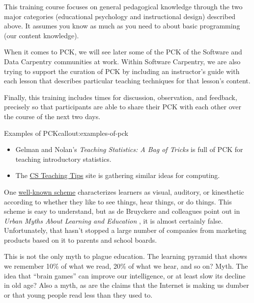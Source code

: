 This training course focuses on general pedagogical knowledge through
the two major categories (educational psychology and instructional
design) described above. It assumes you know as much as you need to
about basic programming (our content knowledge).

When it comes to PCK, we will see later  some
of the PCK of the Software and Data Carpentry communities at
work. Within Software Carpentry, we are also trying to support the
curation of PCK by including an instructor's guide with each lesson
that describes particular teaching techniques for that lesson's
content.

Finally, this training includes times for discussion, observation, and
feedback, precisely so that participants are able to share their PCK
with each other over the course of the next two days.

\begin{callout}{Examples of PCK}{callout:examples-of-pck}

\begin{itemize}
\item
  Gelman and Nolan's
  \emph{Teaching   Statistics: A Bag of Tricks} \cite{bib:gelman-nolan-stats-tricks}
  is full of PCK for teaching introductory statistics.
\item
  The \href{http://csteachingtips.org/}{CS Teaching Tips} site is
  gathering similar ideas for computing.
\end{itemize}
\end{callout}


One
\href{https://en.wikipedia.org/wiki/Learning\_styles\#Learning\_modalities}{well-known
scheme} characterizes learners as visual, auditory, or kinesthetic
according to whether they like to see things, hear things, or do things.
This scheme is easy to understand, but as de Bruyckere and colleagues
point out in
\emph{Urban Myths About Learning and Education} \cite{bib:debruyckere-urban-myths},
it is almost certainly false.
Unfortunately, that hasn't stopped a large number of companies from
marketing products based on it to parents and school boards.

This is not the only myth to plague education. The learning pyramid that
shows we remember 10\% of what we read, 20\% of what we hear, and so on?
Myth.
The idea that ``brain games'' can improve our intelligence, or at least
slow its decline in old age?
Also a myth, as are the claims that the Internet is making us dumber or that
young people read less than they used to.

